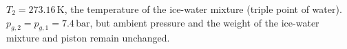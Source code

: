 \( T_2 = 273.16 \, \text{K} \), the temperature of the ice-water mixture (triple point of water).  
\( p_{g,2} = p_{g,1} = 7.4 \, \text{bar} \), but ambient pressure and the weight of the ice-water mixture and piston remain unchanged.